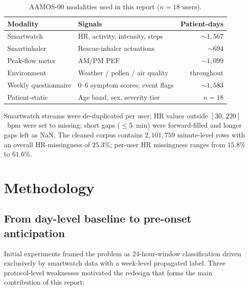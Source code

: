 \documentclass[11pt,a4paper]{article}
\begin{document}
\begin{table}[H]
\centering
\caption{AAMOS-00 modalities used in this report ($n=18$ users).}
\label{tab:modalities}
\small
\begin{tabularx}{\linewidth}{lXr}
\toprule
\textbf{Modality} & \textbf{Signals} & \textbf{Patient-days} \\
\midrule
Smartwatch         & HR, activity, intensity, steps & ${\sim}1{,}567$ \\
Smartinhaler       & Rescue-inhaler actuations      & ${\sim}694$ \\
Peak-flow meter    & AM/PM PEF                      & ${\sim}1{,}099$ \\
Environment        & Weather / pollen / air quality & throughout \\
Weekly questionnaire & 0--6 symptom scores; event flags & ${\sim}1{,}583$ \\
Patient-static     & Age band, sex, severity tier   & $n=18$ \\
\bottomrule
\end{tabularx}
\end{table}

Smartwatch streams were de-duplicated per user; HR values outside
$[30,\,220]$~bpm were set to missing; short gaps ($\leq 5$~min) were
forward-filled and longer gaps left as NaN.  The cleaned corpus
contains $2{,}101{,}759$ minute-level rows with an overall
HR-missingness of $25.3\%$; per-user HR missingness ranges from
$15.8\%$ to $61.6\%$.

\section{Methodology}\label{sec:method}

\subsection{From day-level baseline to pre-onset anticipation}

Initial experiments framed the problem as 24-hour-window classification
driven exclusively by smartwatch data with a week-level propagated
label.  Three protocol-level weaknesses motivated the redesign that
forms the main contribution of this report:
\end{document}

